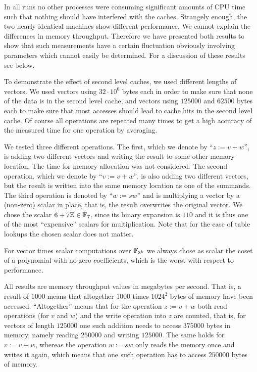 In all runs no other processes
were consuming significant amounts of CPU time such that nothing should
have interfered with the caches. Strangely enough, the two nearly identical
machines show different performance. 
We cannot explain the differences in memory throughput.
Therefore we have presented both
results to show that such measurements have a certain fluctuation
obviously involving parameters which cannot easily be determined.
For a discussion of these results see below.

To demonstrate the effect of second level caches, we used different 
%
lengths of vectors. We used vectors using $32 \cdot 10^6$ bytes each in
order to make sure that none of the data is in the second level cache,
and vectors using $125000$ and $62500$ bytes each to make sure that
most accesses should lead to cache hits in the second level cache.
Of course all operations are repeated many times to get a high accuracy
of the measured time for one operation by averaging.

We tested three different operations. The first, which we denote by 
``$z := v+w$'', is adding two different vectors and writing the
result to some other memory location. The time for memory allocation
was not considered. The second operation, which we denote by 
``$v := v+w$'', is also adding two different vectors, but the result
is written into the same memory location as one of the summands.
The third operation is denoted by ``$w := sw$'' and is multiplying
a vector by a (non-zero) scalar in place, that is, the result overwrites
the original vector. We chose the scalar $6 + 7\mathbb{Z} \in \mathbb{F}_7$, since its
binary expansion is $110$ and it is thus one of the most ``expensive'' scalars
for multiplication. Note that for the case of table lookups the chosen
scalar does not matter.

For vector times scalar computations over $\mathbb{F}_{3^k}$ we always chose as
scalar the coset of a polynomial with no zero coefficients, which is
the worst with respect to performance.

All results are memory throughput values in megabytes per second. 
That is, a result of $1000$ means that altogether $1000$ times
$1024^2$ bytes of memory have been accessed. ``Altogether'' means that for
the operation $z := v+w$ both read operations (for $v$ and $w$) and the
write operation into $z$ are counted, that is, for vectors of length
$125000$ one such addition needs to access $375000$ bytes in memory,
namely reading $250000$ and writing $125000$. The same holds for
$v := v + w$, whereas the operation $w := sw$ only reads the memory once
and writes it again, which means that one such operation has to access
$250000$ bytes of memory.

